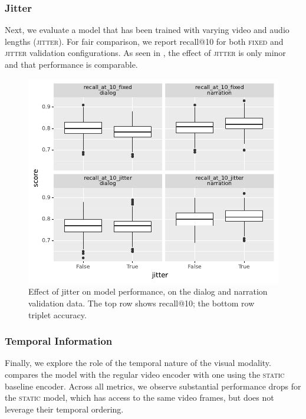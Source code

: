 \subsubsection{Jitter}
Next, we evaluate a model that has been trained with varying video and audio 
lengths (\textsc{jitter}). For fair comparison, we report recall@10 for both 
\textsc{fixed} and \textsc{jitter} validation configurations.
As seen in , the effect of \textsc{jitter} is only
minor and that performance is comparable. 
\begin{figure}[htb]
	\centering
	\includegraphics[width=\columnwidth]{results/ablations/jitter.pdf}
	\caption{Effect of jitter on model performance, on the dialog
          and narration validation data. The top row shows recall@10;
          the bottom row triplet accuracy.}
	\label{fig:jitter}
\end{figure}



\subsubsection{Temporal Information}
Finally, we explore the role of the temporal nature of the visual
modality.   compares the model with the regular video
encoder with one using the \textsc{static} baseline encoder. Across
all metrics, we observe substantial performance drops for the
\textsc{static} model, which has access to the same video frames, but
does not leverage their temporal ordering. 

